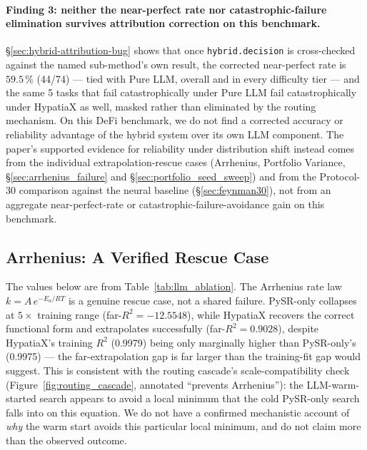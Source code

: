 \documentclass[twoside,11pt]{article}
\newcommand{\Rsq}{R^{2}}
\begin{document}
\paragraph{Finding 3: neither the near-perfect rate nor catastrophic-failure
elimination survives attribution correction on this benchmark.} 
\S\ref{sec:hybrid-attribution-bug} shows that once \texttt{hybrid.decision} is cross-checked against the named sub-method's
own result, the corrected near-perfect rate is $59.5\,\%$ (44/74) --- tied
with Pure LLM, overall and in every difficulty tier --- and the same 5 tasks
that fail catastrophically under Pure LLM fail catastrophically under
HypatiaX as well, masked rather than eliminated by the routing mechanism. On
this DeFi benchmark, we do not find a corrected accuracy or reliability
advantage of the hybrid system over its own LLM component. The paper's
supported evidence for reliability under distribution shift instead comes
from the individual extrapolation-rescue cases (Arrhenius, Portfolio
Variance, \S\ref{sec:arrhenius_failure} and \S\ref{sec:portfolio_seed_sweep})
and from the Protocol-30 comparison against the neural baseline
(\S\ref{sec:feynman30}), not from an aggregate near-perfect-rate or
catastrophic-failure-avoidance gain on this benchmark.

\subsection{Arrhenius: A Verified Rescue Case}\label{subsec:arrhenius-and-scaleincompatibility-failu}
\label{sec:arrhenius_failure}

The values below are from Table~\ref{tab:llm_ablation}. The Arrhenius rate law $k = A\,e^{-E_a / RT}$
is a genuine rescue case, not a shared failure. PySR-only collapses at
$5\times$ training range (far-$\Rsq = -12.5548$), while HypatiaX recovers
the correct functional form and extrapolates successfully (far-$\Rsq =
0.9028$), despite HypatiaX's training $\Rsq$ (0.9979) being only marginally
higher than PySR-only's (0.9975) --- the far-extrapolation gap is far larger
than the training-fit gap would suggest. This is consistent with the
routing cascade's scale-compatibility check (Figure~\ref{fig:routing_cascade},
annotated ``prevents Arrhenius''): the LLM-warm-started search appears to
avoid a local minimum that the cold PySR-only search falls into on this
equation. We do not have a confirmed mechanistic account of \emph{why} the
warm start avoids this particular local minimum, and do not claim more than
the observed outcome.
\end{document}
